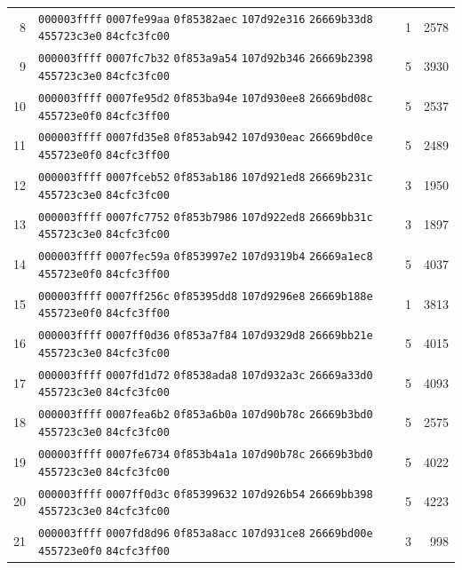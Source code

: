 \begin{longtable}{@{}r p{12cm} r r@{}}
8 & \texttt{000003ffff} \texttt{0007fe99aa} \texttt{0f85382aec} \texttt{107d92e316} \texttt{26669b33d8} \texttt{455723c3e0} \texttt{84cfc3fc00} & 1 & 2578 \\
9 & \texttt{000003ffff} \texttt{0007fc7b32} \texttt{0f853a9a54} \texttt{107d92b346} \texttt{26669b2398} \texttt{455723c3e0} \texttt{84cfc3fc00} & 5 & 3930 \\
10 & \texttt{000003ffff} \texttt{0007fe95d2} \texttt{0f853ba94e} \texttt{107d930ee8} \texttt{26669bd08c} \texttt{455723e0f0} \texttt{84cfc3ff00} & 5 & 2537 \\
11 & \texttt{000003ffff} \texttt{0007fd35e8} \texttt{0f853ab942} \texttt{107d930eac} \texttt{26669bd0ce} \texttt{455723e0f0} \texttt{84cfc3ff00} & 5 & 2489 \\
12 & \texttt{000003ffff} \texttt{0007fceb52} \texttt{0f853ab186} \texttt{107d921ed8} \texttt{26669b231c} \texttt{455723c3e0} \texttt{84cfc3fc00} & 3 & 1950 \\
13 & \texttt{000003ffff} \texttt{0007fc7752} \texttt{0f853b7986} \texttt{107d922ed8} \texttt{26669bb31c} \texttt{455723c3e0} \texttt{84cfc3fc00} & 3 & 1897 \\
14 & \texttt{000003ffff} \texttt{0007fec59a} \texttt{0f853997e2} \texttt{107d9319b4} \texttt{26669a1ec8} \texttt{455723e0f0} \texttt{84cfc3ff00} & 5 & 4037 \\
15 & \texttt{000003ffff} \texttt{0007ff256c} \texttt{0f85395dd8} \texttt{107d9296e8} \texttt{26669b188e} \texttt{455723e0f0} \texttt{84cfc3ff00} & 1 & 3813 \\
16 & \texttt{000003ffff} \texttt{0007ff0d36} \texttt{0f853a7f84} \texttt{107d9329d8} \texttt{26669bb21e} \texttt{455723c3e0} \texttt{84cfc3fc00} & 5 & 4015 \\
17 & \texttt{000003ffff} \texttt{0007fd1d72} \texttt{0f8538ada8} \texttt{107d932a3c} \texttt{26669a33d0} \texttt{455723c3e0} \texttt{84cfc3fc00} & 5 & 4093 \\
18 & \texttt{000003ffff} \texttt{0007fea6b2} \texttt{0f853a6b0a} \texttt{107d90b78c} \texttt{26669b3bd0} \texttt{455723c3e0} \texttt{84cfc3fc00} & 5 & 2575 \\
19 & \texttt{000003ffff} \texttt{0007fe6734} \texttt{0f853b4a1a} \texttt{107d90b78c} \texttt{26669b3bd0} \texttt{455723c3e0} \texttt{84cfc3fc00} & 5 & 4022 \\
20 & \texttt{000003ffff} \texttt{0007ff0d3c} \texttt{0f85399632} \texttt{107d926b54} \texttt{26669bb398} \texttt{455723c3e0} \texttt{84cfc3fc00} & 5 & 4223 \\
21 & \texttt{000003ffff} \texttt{0007fd8d96} \texttt{0f853a8acc} \texttt{107d931ce8} \texttt{26669bd00e} \texttt{455723e0f0} \texttt{84cfc3ff00} & 3 & 998 \\

\end{longtable}
